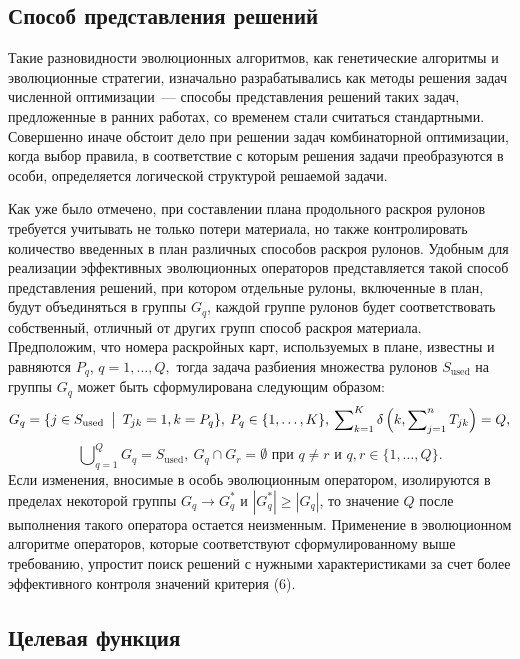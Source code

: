 \documentclass[12pt]{article}
\begin{document}
\subsection{Способ представления решений}

Такие разновидности эволюционных алгоритмов, как генетические алгоритмы и 
эволюционные стратегии, изначально разрабатывались как методы решения задач 
численной оптимизации~--- способы представления решений таких задач, 
предложенные в ранних работах, со временем стали считаться стандартными. 
Совершенно иначе обстоит дело при решении задач комбинаторной оптимизации, 
когда выбор правила, в соответствие с которым решения задачи преобразуются в 
особи, определяется логической структурой решаемой задачи.

Как уже было отмечено, при составлении плана продольного раскроя рулонов 
требуется учитывать не только потери материала, но также контролировать 
количество введенных в план различных способов раскроя рулонов. Удобным для 
реализации эффективных эволюционных операторов представляется такой способ 
представления решений, при котором отдельные рулоны, включенные в план, 
будут объединяться в группы $G_q$, каждой группе рулонов будет соответствовать 
собственный, отличный от других групп способ раскроя материала. Предположим, 
что номера раскройных карт, используемых в плане, известны и равняются $P_q$, 
$q=1,\ldots,Q,$ тогда задача разбиения множества рулонов $S_{\text{used}}$ 
на группы $G_q$ может быть сформулирована следующим образом:
\[ G_q=\{ j \in S_{\text{used}} \: \bigm| \: T_{jk}=1,k=P_q \}, \: 
   P_q \in \{1,\ldots,K\}, \: 
   \sum\nolimits_{k=1}^{K} \delta\left(k, \sum\nolimits_{j=1}^{n} T_{jk}\right)=Q, \]
\[ \bigcup\nolimits_{q=1}^{Q}G_q=S_{\text{used}}, \: 
   G_q \cap G_r=\emptyset \text{ при } q \neq r \text{ и } q,r \in \{1,\ldots,Q\}.
\]
Если изменения, вносимые в особь эволюционным оператором, изолируются в 
пределах некоторой группы $G_q \rightarrow G_q^*$ и $|G_q^*| \geq |G_q|$, то 
значение $Q$ после выполнения такого оператора остается неизменным. Применение 
в эволюционном алгоритме операторов, которые соответствуют сформулированному 
выше требованию, упростит поиск решений с нужными характеристиками за счет 
более эффективного контроля значений критерия (6).

\subsection{Целевая функция}
\end{document}

